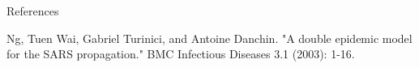 \documentclass{bmcart}
\begin{document}


\begin{backmatter}

References

Ng, Tuen Wai, Gabriel Turinici, and Antoine Danchin. "A double epidemic model for the SARS propagation." BMC Infectious Diseases 3.1 (2003): 1-16.


\end{backmatter}
\end{document}

